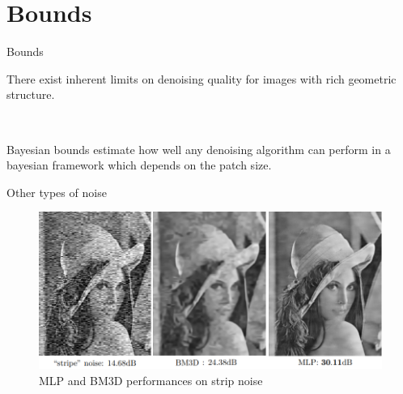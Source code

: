 \documentclass[8pt]{beamer}
\begin{document}
\section{Bounds}

\begin{frame}{Bounds}

\begin{mybox}
There exist inherent limits on denoising quality for images with rich geometric structure.
\end{mybox}\

\begin{mybox}
Bayesian bounds estimate how well any denoising algorithm can perform in a bayesian framework which depends on the patch size.
\end{mybox}

\end{frame}

\begin{frame}{Other types of noise}

\begin{figure}[H]
    \begin{center}
        \includegraphics[scale=0.45]{../datasets/images/stripnoise.png}
        \caption{MLP and BM3D performances on strip noise}
    \end{center}
\end{figure}
\end{frame}
\end{document}
